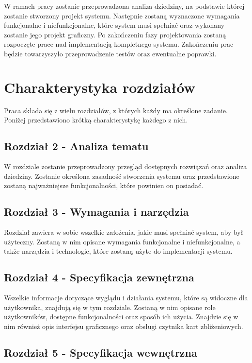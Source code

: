 W ramach pracy zostanie przeprowadzona analiza dziedziny, na podstawie której zostanie stworzony projekt systemu. Następnie zostaną wyznaczone wymagania funkcjonalne i niefunkcjonalne, które system musi spełniać oraz wykonany zostanie jego projekt graficzny. Po zakończeniu fazy projektowania zostaną rozpoczęte prace nad implementacją kompletnego systemu. Zakończeniu prac będzie towarzyszyło przeprowadzenie testów oraz ewentualne poprawki.

\section{Charakterystyka rozdziałów}

Praca składa się z wielu rozdziałów, z których każdy ma określone zadanie. Poniżej przedstawiono krótką charakterystykę każdego z nich.

\subsection*{Rozdział 2 - Analiza tematu}

W rozdziale zostanie przeprowadzony przegląd dostępnych rozwiązań oraz analiza dziedziny. Zostanie określona zasadność stworzenia systemu oraz przedstawione zostaną najważniejsze funkcjonalności, które powinien on posiadać.

\subsection*{Rozdział 3 - Wymagania i narzędzia}

Rozdział zawiera w sobie wszelkie założenia, jakie musi spełniać system, aby był użyteczny. Zostaną w nim opisane wymagania funkcjonalne i niefunkcjonalne, a także narzędzia i technologie, które zostaną użyte do implementacji systemu.

\subsection*{Rozdział 4 - Specyfikacja zewnętrzna}

Wszelkie informacje dotyczące wyglądu i działania systemu, które są widoczne dla użytkownika, znajdują się w tym rozdziale. Zostaną w nim opisane role użytkowników, dostępne funkcjonalności oraz sposób ich użycia. Znajdzie się w nim również opis interfejsu graficznego oraz obsługi czytnika kart zbliżeniowych.

\subsection*{Rozdział 5 - Specyfikacja wewnętrzna}

